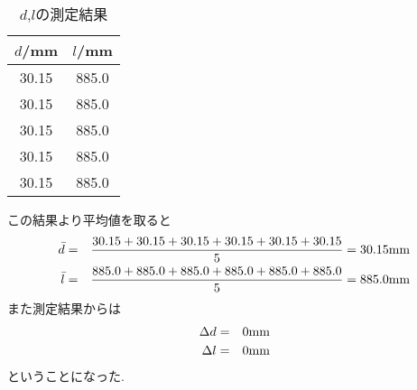\documentclass[a4j,10pt]{jarticle}
\begin{document}
  \begin{table}[h]
    \centering
    \caption{$d$,$l$の測定結果}
    \label{dresult}
    \begin{tabular}{c c} \hline
        $d$/mm & $l$/mm \\ \hline
        30.15 & 885.0 \\
        30.15 & 885.0 \\
        30.15 & 885.0 \\
        30.15 & 885.0 \\
        30.15 & 885.0 \\ \hline
    \end{tabular}
  \end{table}
  この結果より平均値を取ると
  \begin{eqnarray*}
    \bar{d} &=& \frac{30.15+30.15+30.15+30.15+30.15+30.15}{5} = 30.15 {\rm mm} \\
    \bar{l} &=& \frac{885.0+885.0+885.0+885.0+885.0+885.0}{5} = 885.0 {\rm mm} \\
  \end{eqnarray*}
  また測定結果からは
  \begin{eqnarray*}
    \Delta d &=& 0 {\rm mm} \\
    \Delta l &=& 0 {\rm mm} \\
  \end{eqnarray*}
  ということになった.
\end{document}
